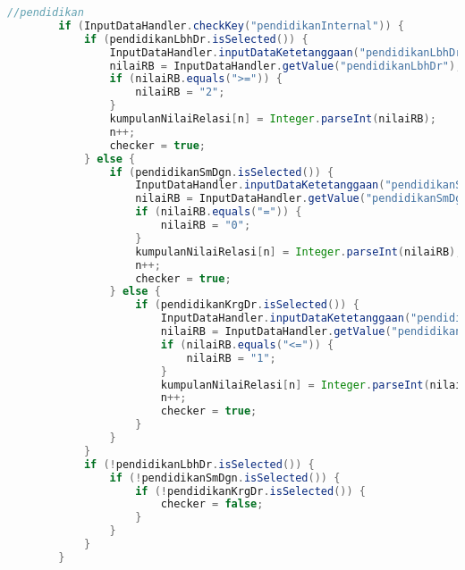 \begin{lstlisting}[language=Java, caption=TampilanKondisiKetetanggaan.java]
        //pendidikan
        if (InputDataHandler.checkKey("pendidikanInternal")) {
            if (pendidikanLbhDr.isSelected()) {
                InputDataHandler.inputDataKetetanggaan("pendidikanLbhDr", pendidikanLbhDr.getText());
                nilaiRB = InputDataHandler.getValue("pendidikanLbhDr");
                if (nilaiRB.equals(">=")) {
                    nilaiRB = "2";
                }
                kumpulanNilaiRelasi[n] = Integer.parseInt(nilaiRB);
                n++;
                checker = true;
            } else {
                if (pendidikanSmDgn.isSelected()) {
                    InputDataHandler.inputDataKetetanggaan("pendidikanSmDgn", pendidikanSmDgn.getText());
                    nilaiRB = InputDataHandler.getValue("pendidikanSmDgn");
                    if (nilaiRB.equals("=")) {
                        nilaiRB = "0";
                    }
                    kumpulanNilaiRelasi[n] = Integer.parseInt(nilaiRB);
                    n++;
                    checker = true;
                } else {
                    if (pendidikanKrgDr.isSelected()) {
                        InputDataHandler.inputDataKetetanggaan("pendidikanKurangDari", pendidikanKrgDr.getText());
                        nilaiRB = InputDataHandler.getValue("pendidikanKurangDari");
                        if (nilaiRB.equals("<=")) {
                            nilaiRB = "1";
                        }
                        kumpulanNilaiRelasi[n] = Integer.parseInt(nilaiRB);
                        n++;
                        checker = true;
                    }
                }
            }
            if (!pendidikanLbhDr.isSelected()) {
                if (!pendidikanSmDgn.isSelected()) {
                    if (!pendidikanKrgDr.isSelected()) {
                        checker = false;
                    }
                }
            }
        }


\end{lstlisting}
